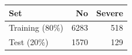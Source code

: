 
\begin{tabular}{lrr}
\toprule
Set & No & Severe\\
\midrule
Training (80\%) & 6283 & 518\\
Test (20\%) & 1570 & 129\\
\bottomrule
\end{tabular}
